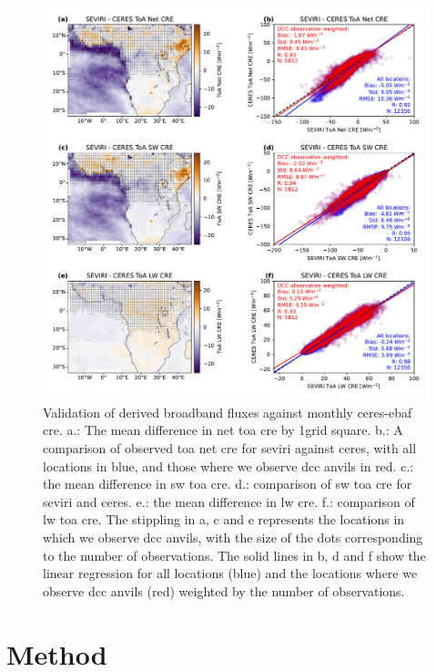 \documentclass[acp, manuscript]{copernicus}
\begin{document}
\begin{figure}[tp]
    \includegraphics[width=12cm]{figures/fig03.pdf}
    \caption[
    Validation of derived broadband fluxes against monthly \acrshort{ceres}-\acrshort{ebaf} \acrshort{cre}
    ]{
    Validation of derived broadband fluxes against monthly \acrshort{ceres}-\acrshort{ebaf} \acrshort{cre}. a.: The mean difference in net \acrshort{toa} \acrshort{cre} by 1\textdegree grid square. b.: A comparison of observed \acrshort{toa} net \acrshort{cre} for \acrshort{seviri} against \acrshort{ceres}, with all locations in blue, and those where we observe \acrshort{dcc} anvils in red. c.: the mean difference in \acrshort{sw} \acrshort{toa} \acrshort{cre}. d.: comparison of \acrshort{sw} \acrshort{toa} \acrshort{cre} for \acrshort{seviri} and \acrshort{ceres}. e.: the mean difference in \acrshort{lw} \acrshort{cre}. f.: comparison of \acrshort{lw} \acrshort{toa} \acrshort{cre}. The stippling in a, c and e represents the locations in which we observe \acrshort{dcc} anvils, with the size of the dots corresponding to the number of observations. The solid lines in b, d and f show the linear regression for all locations (blue) and the locations where we observe \acrshort{dcc} anvils (red) weighted by the number of observations.
    }
    \label{fig:flux_validation}
\end{figure}

\section{Method}
\end{document}

